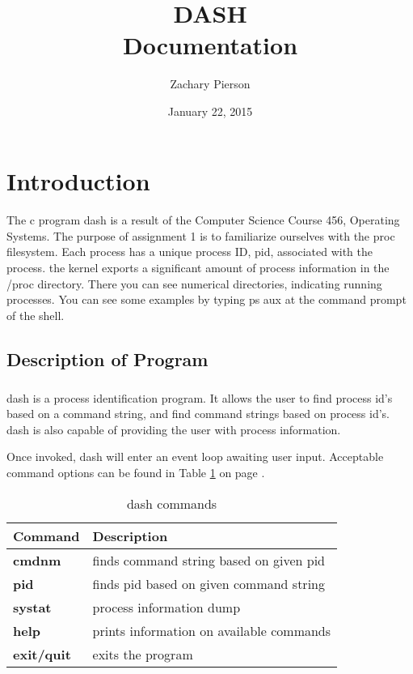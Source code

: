 \documentclass[10pt]{article}
\title{\textbf{DASH} \\Documentation}
\date{January 22, 2015}
\author{Zachary Pierson}
\begin{document}
\maketitle

\newpage
\par\vspace{\fill}
\tableofcontents
\newpage

\section{Introduction}
\paragraph{}
The c program dash is a result of the Computer Science Course 456, Operating Systems. The purpose of assignment 1 is to familiarize ourselves with the proc filesystem. Each process has a unique process ID, pid, associated with the process. the kernel exports a significant amount of process information in the /proc directory. There you can see numerical directories, indicating running processes. You can see some examples by typing ps aux at the command prompt of the shell.

\subsection{Description of Program}
\subparagraph{}
dash is a process identification program. It allows the user to find process id's based on a command string, and find command strings based on process id's. dash is also capable of providing the user with process information.

Once invoked, dash will enter an event loop awaiting user input. Acceptable command options can be found in Table \ref{table:dashcmds} on page \pageref{table:dashcmds}.

\begin{table}[b]
\centering
\begin{tabular}{l|l}
	Command & Description\\\hline
	\textbf{cmdnm} & finds command string based on given pid\\
	\textbf{pid} & finds pid based on given command string\\
	\textbf{systat} & process information dump\\
	\textbf{help} & prints information on available commands\\
	\textbf{exit/quit} & exits the program\\
\end{tabular}
\caption{dash commands}
\label{table:dashcmds}
\end{table}
\end{document}
